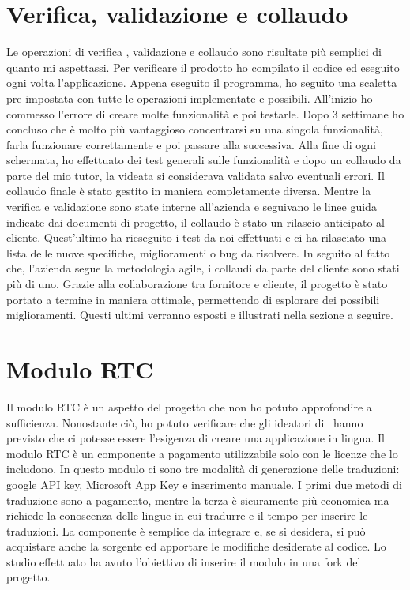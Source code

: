 \section{Verifica, validazione e collaudo}
Le operazioni di verifica , validazione e collaudo sono risultate più semplici di quanto mi aspettassi. Per verificare il prodotto ho compilato il codice ed eseguito ogni volta l'applicazione. 
Appena eseguito il programma, ho seguito una scaletta pre-impostata con tutte le operazioni implementate e possibili. All'inizio ho commesso l'errore di creare molte funzionalità e poi testarle. Dopo 3 settimane ho concluso che è molto più vantaggioso concentrarsi su una singola funzionalità, farla funzionare correttamente e poi passare alla successiva.
Alla fine di ogni schermata, ho effettuato dei test generali sulle funzionalità e dopo un collaudo da parte del mio tutor, la videata  si considerava validata salvo eventuali errori.  
Il collaudo finale è stato gestito in maniera completamente diversa. Mentre la verifica e validazione sono state interne all'azienda e seguivano le linee guida indicate dai documenti di progetto, il collaudo è stato un rilascio anticipato al cliente. Quest'ultimo ha rieseguito i test da noi effettuati e ci ha rilasciato una lista delle nuove specifiche, miglioramenti o bug da risolvere. 
In seguito al fatto che, l'azienda segue la metodologia agile, i collaudi da parte del cliente sono stati più di uno. Grazie alla collaborazione tra fornitore e cliente, il progetto è stato portato a termine in maniera ottimale, permettendo di esplorare dei possibili miglioramenti.
Questi ultimi verranno esposti e illustrati nella sezione a seguire.

\section{Modulo RTC}
Il modulo RTC è un aspetto del progetto che non ho potuto approfondire a sufficienza. Nonostante ciò, ho potuto verificare che gli ideatori di \inde\ hanno previsto che ci potesse essere l'esigenza di creare una applicazione in lingua.
Il modulo RTC è un componente a pagamento utilizzabile solo con le licenze che lo includono. In questo modulo ci sono tre modalità di generazione delle traduzioni: google API key, Microsoft App Key e inserimento manuale. 
I primi due metodi di traduzione sono a pagamento, mentre la terza è sicuramente più economica ma richiede la conoscenza delle lingue in cui tradurre e il tempo per inserire le traduzioni.
La componente è semplice da integrare e, se si desidera, si può acquistare anche la sorgente ed apportare le modifiche desiderate al codice.
Lo studio effettuato ha avuto l'obiettivo di inserire il modulo in una fork del progetto.
 
